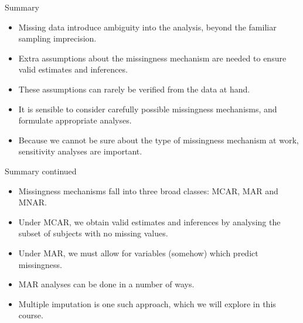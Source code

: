 \documentclass[ignorenonframetext,]{beamer}
\providecommand{\tightlist}{%
  \setlength{\itemsep}{0pt}\setlength{\parskip}{0pt}}
\begin{document}
\begin{frame}{Summary}
\protect\hypertarget{summary}{}

\begin{itemize}
\tightlist
\item
  Missing data introduce ambiguity into the analysis, beyond the
  familiar sampling imprecision.
\item
  Extra assumptions about the missingness mechanism are needed to ensure
  valid estimates and inferences.
\item
  These assumptions can rarely be verified from the data at hand.
\item
  It is sensible to consider carefully possible missingness mechanisms,
  and formulate appropriate analyses.
\item
  Because we cannot be sure about the type of missingness mechanism at
  work, sensitivity analyses are important.
\end{itemize}

\end{frame}

\begin{frame}{Summary continued}
\protect\hypertarget{summary-continued}{}

\begin{itemize}
\tightlist
\item
  Missingness mechanisms fall into three broad classes: MCAR, MAR and
  MNAR.
\item
  Under MCAR, we obtain valid estimates and inferences by analysing the
  subset of subjects with no missing values.
\item
  Under MAR, we must allow for variables (somehow) which predict
  missingness.
\item
  MAR analyses can be done in a number of ways.
\item
  Multiple imputation is one such approach, which we will explore in
  this course.
\end{itemize}

\end{frame}
\end{document}
